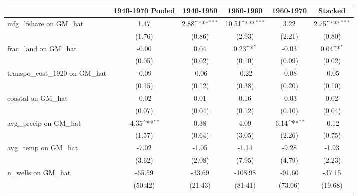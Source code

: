 \begin{table}[htbp]\centering
\def\sym#1{\ifmmode^{#1}\else\(^{#1}\)\fi}
\caption{}
\begin{tabular}{l*{5}{c}}
\toprule
                &\multicolumn{1}{c}{1940-1970 Pooled}&\multicolumn{1}{c}{1940-1950}&\multicolumn{1}{c}{1950-1960}&\multicolumn{1}{c}{1960-1970}&\multicolumn{1}{c}{Stacked}\\
\midrule
mfg\_lfshare on GM\_hat&     1.47         &     2.88\sym{***}&    10.51\sym{***}&     3.22         &     2.75\sym{***}\\
                &   (1.76)         &   (0.86)         &   (2.93)         &   (2.21)         &   (0.80)         \\
\addlinespace
frac\_land on GM\_hat&    -0.00         &     0.04         &     0.23\sym{*}  &    -0.03         &     0.04\sym{*}  \\
                &   (0.05)         &   (0.02)         &   (0.10)         &   (0.09)         &   (0.02)         \\
\addlinespace
transpo\_cost\_1920 on GM\_hat&    -0.09         &    -0.06         &    -0.22         &    -0.08         &    -0.05         \\
                &   (0.15)         &   (0.12)         &   (0.38)         &   (0.20)         &   (0.10)         \\
\addlinespace
coastal on GM\_hat&    -0.02         &     0.01         &     0.16         &    -0.03         &     0.02         \\
                &   (0.07)         &   (0.04)         &   (0.12)         &   (0.10)         &   (0.04)         \\
\addlinespace
avg\_precip on GM\_hat&    -4.35\sym{**} &     0.38         &     4.09         &    -6.14\sym{**} &    -0.12         \\
                &   (1.57)         &   (0.64)         &   (3.05)         &   (2.26)         &   (0.75)         \\
\addlinespace
avg\_temp on GM\_hat&    -7.02         &    -1.05         &    -1.14         &    -9.28         &    -1.93         \\
                &   (3.62)         &   (2.08)         &   (7.95)         &   (4.79)         &   (2.23)         \\
\addlinespace
n\_wells on GM\_hat&   -65.59         &   -33.69         &  -108.98         &   -91.60         &   -37.15         \\
                &  (50.42)         &  (21.43)         &  (81.41)         &  (73.06)         &  (19.68)         \\

\end{tabular}
\end{table}

